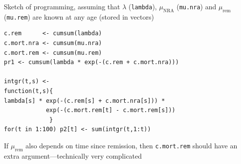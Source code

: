 \begin{frame}[fragile]
  Sketch of programming, assuming that 
$\lambda$ (\texttt{lambda}), 
$\mu_\text{NRA}$ (\texttt{mu.nra}) and
$\mu_\text{rem}$ (\texttt{mu.rem}) are known at any age (stored in vectors)
\renewcommand{\baselinestretch}{0.85}
\footnotesize
\begin{verbatim}
c.rem      <- cumsum(lambda)
c.mort.nra <- cumsum(mu.nra)
c.mort.rem <- cumsum(mu.rem)
pr1 <- cumsum(lambda * exp(-(c.rem + c.mort.nra)))

intgr(t,s) <- 
function(t,s){
lambda[s] * exp(-(c.rem[s] + c.mort.nra[s])) *
            exp(-(c.mort.rem[t] - c.mort.rem[s]))
             }
for(t in 1:100) p2[t] <- sum(intgr(t,1:t))
\end{verbatim}
\normalsize
\renewcommand{\baselinestretch}{1.00}
If $\mu_\text{rem}$ also depends on time since remission, then
\texttt{c.mort.rem} should have an extra argument---technically very complicated
\end{frame}

